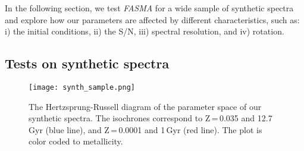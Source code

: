 \documentclass[fleqn,usenatbib]{mnras}
\begin{document}
In the following section, we test \textit{FASMA} for a wide sample of synthetic spectra and explore how our parameters are affected by different characteristics, such as: 
i) the initial conditions, ii) the S/N, iii) spectral resolution, and iv) rotation. 

\subsection{Tests on synthetic spectra}\label{synthetic_test}

\begin{figure}
 \centering
 \texttt{[image: synth\_sample.png]}  
 \caption{The Hertzsprung-Russell diagram of the parameter space of our synthetic spectra. The isochrones correspond to Z\,=\,0.035 and 12.7\,Gyr (blue line), and Z\,=\,0.0001 and 1\,Gyr 
 (red line). The plot is color coded to metallicity.}
\label{fig_synth_sample}
\end{figure}
\end{document}
